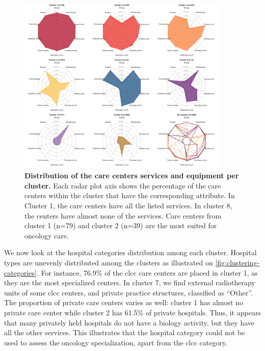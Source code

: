\begin{figure}[h!]
    \includegraphics[width=0.9\textwidth]{images/camion/fig1_clusters_services.png}
    \centering
    \caption{ \textbf{Distribution of the care centers services and equipment
            per cluster.} Each radar plot axis shows the percentage of the care
        centers within the cluster that have the corresponding attribute. In
        Cluster 1, the care centers have all the listed services. In cluster 8,
        the centers have almost none of the services. Care centers from cluster
        1 (n=79) and cluster 2 (n=39) are the most suited for oncology care. }
    \label{fig:clustering-spider}
\end{figure}

We now look at the hospital categories distribution among each cluster. Hospital
types are unevenly distributed among the clusters as illustrated on
\cref{fig:clustering-categories}. For instance, 76.9\% of the \ac{clcc} care
centers are placed in cluster 1, as they are the most specialized centers. In
cluster 7, we find external radiotherapy units of some \ac{clcc} centers, and
private practice structures, classified as ``Other''. The proportion of private
care centers varies as well: cluster 1 has almost no private care center while
cluster 2 has 61.5\% of private hospitals. Thus, it appears that many privately
held hospitals do not have a biology activity, but they have all the other
services. This illustrates that the hospital category could not be used to
assess the oncology specialization, apart from the \ac{clcc} category.

